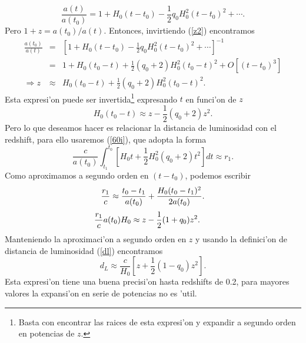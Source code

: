 \begin{equation}
\frac{a(t)}{a(t_0)}=1+H_0(t-t_0)-\frac{1}{2}q_0H_0^2(t-t_0)^2+\cdots .\label{z2}
\end{equation}
Pero $1+z=a(t_0)/a(t)$. Entonces, invirtiendo (\ref{z2}) encontramos
\begin{eqnarray}
 \frac{a(t_0)}{a(t)}&=&\left[1+H_0(t-t_0)-\frac{1}{2}q_0H_0^2(t-t_0)^2+\cdots\right]^{-1} \\
&=& 1+H_0(t_0-t)+\frac{1}{2}(q_0 +2)H_0^2(t_0-t)^2+ O\left[(t-t_{0})^3\right]\\
\Rightarrow z&\approx&H_0(t_0-t)+\frac{1}{2}(q_0 +2)H_0^2(t_0-t)^2.   \label{z3}
\end{eqnarray}
Esta expresi'on puede ser invertida\footnote{Basta con encontrar las raices de esta expresi'on y expandir a segundo orden en potencias de $z$.} expresando $t$ en funci'on de $z$
\begin{equation}
 H_{0}(t_0 -t)\approx  z -\frac{1}{2}(q_0 +2)z^2.
\end{equation}
Pero lo que deseamos hacer es relacionar la distancia de luminosidad con el redshift, para ello usaremos (\ref{60i}), que adopta la forma
\begin{equation}
\frac{c}{a(t_0)}\int_{t_1}^{t_0}\left[H_{0}t+\frac{1}{2}H_{0}^{2}(q_0 +2)t^2\right]dt \approx r_1.
\end{equation}
Como aproximamos a segundo orden en $(t-t_{0})$, podemos escribir
\begin{equation}
  \frac{r_1}{c} \approx \frac{t_0 -t_1}{a(t_0)} +\frac{H_{0}(t_0 -t_1)^2}{2a(t_0)}.\\
\end{equation}
\begin{equation}
   \frac{r_1}{c} a(t_0) H_0 \approx z -\frac{1}{2}(1+ q_0)z^2. \hspace{0.5cm}
\end{equation}
Manteniendo la aproximaci'on a segundo orden en $z$ y usando la definici'on de distancia de luminosidad (\ref{dl}) encontramos
\begin{equation}
d_{L}\approx \frac{c}{H_0}\left[z+\frac{1}{2}(1-q_0)z^2 \right]. \label{dlq0}
\end{equation}
Esta expresi'on tiene una buena precisi'on hasta redshifts de 0.2, para mayores valores la expansi'on en serie de potencias no es 'util.

